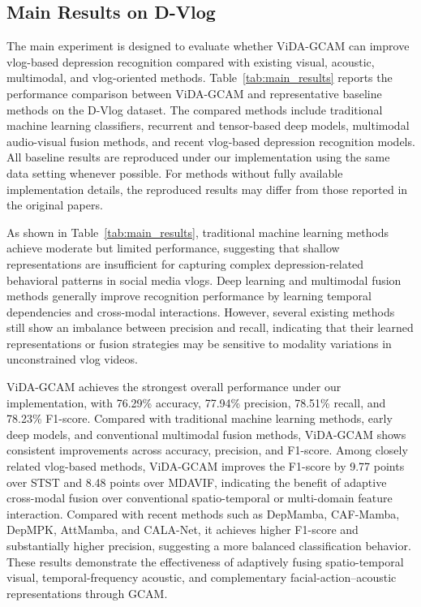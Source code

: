 \documentclass[a4paper,fleqn]{cas-dc}
\begin{document}
\subsection{Main Results on D-Vlog}
The main experiment is designed to evaluate whether ViDA-GCAM can improve vlog-based depression recognition compared with existing visual, acoustic, multimodal, and vlog-oriented methods.
Table~\ref{tab:main_results} reports the performance comparison between ViDA-GCAM and representative baseline methods on the D-Vlog dataset. The compared methods include traditional machine learning classifiers, recurrent and tensor-based deep models, multimodal audio-visual fusion methods, and recent vlog-based depression recognition models. All baseline results are reproduced under our implementation using the same data setting whenever possible. For methods without fully available implementation details, the reproduced results may differ from those reported in the original papers.

As shown in Table~\ref{tab:main_results}, traditional machine learning methods achieve moderate but limited performance, suggesting that shallow representations are insufficient for capturing complex depression-related behavioral patterns in social media vlogs. Deep learning and multimodal fusion methods generally improve recognition performance by learning temporal dependencies and cross-modal interactions. However, several existing methods still show an imbalance between precision and recall, indicating that their learned representations or fusion strategies may be sensitive to modality variations in unconstrained vlog videos.



ViDA-GCAM achieves the strongest overall performance under our implementation, with 76.29\% accuracy, 77.94\% precision, 78.51\% recall, and 78.23\% F1-score. Compared with traditional machine learning methods, early deep models, and conventional multimodal fusion methods, ViDA-GCAM shows consistent improvements across accuracy, precision, and F1-score. Among closely related vlog-based methods, ViDA-GCAM improves the F1-score by 9.77 points over STST and 8.48 points over MDAVIF,
indicating the benefit of adaptive cross-modal fusion over conventional spatio-temporal or multi-domain feature interaction. Compared with recent methods such as DepMamba, CAF-Mamba, DepMPK, AttMamba, and CALA-Net, it achieves higher F1-score and substantially higher precision, suggesting a more balanced classification behavior. These results demonstrate the effectiveness of adaptively fusing spatio-temporal visual, temporal-frequency acoustic, and complementary facial-action–acoustic representations through GCAM.
\end{document}
